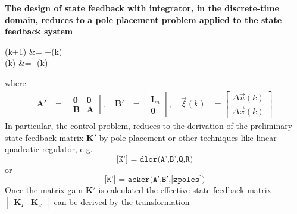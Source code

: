 \documentclass[12pt,a4paper,oneside]{book}
\begin{document}
\begin{onehalfspace}
\vspace{5mm}
\begin{mybox}
	\textbf{The design of state feedback with integrator, in the discrete-time 
		domain, reduces to a pole placement problem applied to the state feedback system}
	\begin{flalign}
		\vec{\xi}(k+1) &= \vec{\xi}+(k) \\[6pt] 
		(k) &= -\vec{\xi}(k)
	\end{flalign}
	where
	\begin{equation}
		\begin{aligned}
			\mathbf{A'} &= 
			\begin{bmatrix}
				\mathbf{0} & \mathbf{0} \\[6pt]  
				\mathbf{B} & \mathbf{A}
			\end{bmatrix}, \quad
			\mathbf{B'} &= 
			\begin{bmatrix}
				\mathbf{I}_m \\[6pt]  
				\mathbf{0}
			\end{bmatrix},	\quad
			\vec{\xi}(k) &= 
			\begin{bmatrix}
				\Delta\vec{u}(k) \\[6pt]  
				\Delta\vec{x}(k)
			\end{bmatrix}	
		\end{aligned}
	\end{equation}
	In particular, the control problem, reduces to the derivation of the preliminary state feedback matrix $\mathbf{K'}$ by pole placement or other techniques like linear quadratic regulator, e.g.
	\begin{equation}
		\texttt{[K'] = dlqr(A',B',Q,R)}
	\end{equation} 
	or
	\begin{equation}
		\texttt{[K'] = acker(A',B',[zpoles])}
	\end{equation} 
	Once the matrix gain $\mathbf{K'}$ is calculated the effective state feedback 
	matrix $\begin{bmatrix} \mathbf{K}_I & \mathbf{K}_x \end{bmatrix}$ can be derived by the transformation
	\begin{equation}

\end{equation}
\end{mybox}
\end{onehalfspace}
\end{document}
